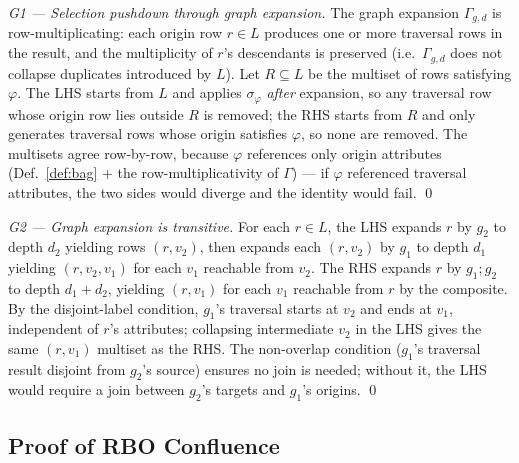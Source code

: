 \documentclass[acmsmall,review,anonymous]{acmart}
\theoremstyle{plain}
\theoremstyle{definition}
\theoremstyle{remark}
\begin{document}
\begin{proof}[G1 --- Selection pushdown through graph expansion]
The graph expansion $\Gamma_{g,d}$ is row-multiplicating: each
origin row $r \in L$ produces one or more traversal rows in the
result, and the multiplicity of $r$'s descendants is preserved
(i.e.\ $\Gamma_{g,d}$ does not collapse duplicates introduced by
$L$). Let $R \subseteq L$ be the multiset of rows satisfying
$\varphi$. The LHS starts from $L$ and applies $\sigma_\varphi$
\emph{after} expansion, so any traversal row whose origin row lies
outside $R$ is removed; the RHS starts from $R$ and only
generates traversal rows whose origin satisfies $\varphi$, so
none are removed. The multisets agree row-by-row, because
$\varphi$ references only origin attributes (Def.~\ref{def:bag} +
the row-multiplicativity of $\Gamma$) --- if $\varphi$ referenced
traversal attributes, the two sides would diverge and the identity
would fail.
\qed
\end{proof}

\begin{proof}[G2 --- Graph expansion is transitive]
For each $r \in L$, the LHS expands $r$ by $g_2$ to depth $d_2$
yielding rows $(r, v_2)$, then expands each $(r, v_2)$ by
$g_1$ to depth $d_1$ yielding $(r, v_2, v_1)$ for each $v_1$
reachable from $v_2$. The RHS expands $r$ by $g_1;g_2$ to
depth $d_1 + d_2$, yielding $(r, v_1)$ for each $v_1$
reachable from $r$ by the composite. By the disjoint-label
condition, $g_1$'s traversal starts at $v_2$ and ends at
$v_1$, independent of $r$'s attributes; collapsing
intermediate $v_2$ in the LHS gives the same $(r, v_1)$
multiset as the RHS. The non-overlap condition
($g_1$'s traversal result disjoint from $g_2$'s source)
ensures no join is needed; without it, the LHS would
require a join between $g_2$'s targets and $g_1$'s origins.
\qed
\end{proof}

\subsection{Proof of RBO Confluence}\label{app:rbo-confluence}
\end{document}
